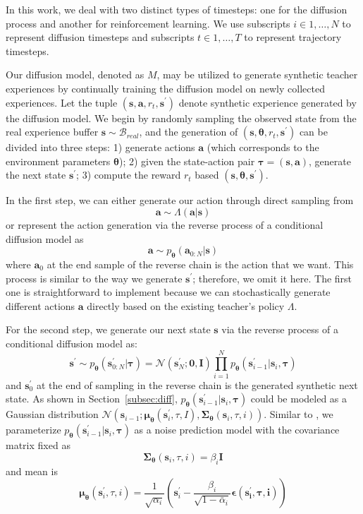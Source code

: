 \documentclass{article}
\newcommand\mI{\bm{I}}
\newcommand\vmu{\bm{\mu}}
\newcommand\va{\bm{a}}
\newcommand\vs{\bm{s}}
\newcommand\mSigma{\bm{\Sigma}}
\begin{document}
In this work, we deal with two distinct types of timesteps: one for the diffusion process and another for reinforcement learning. We use subscripts $i \in {1,\dots, N}$ to represent diffusion timesteps and subscripts $t \in {1,\dots,T}$ to represent trajectory timesteps.


Our diffusion model, denoted as $M$, may be utilized to generate synthetic teacher experiences by continually training the diffusion model on newly collected experiences. Let the tuple $(\vs,\va, r_t,\vs^\prime)$ denote synthetic experience generated by the diffusion model. We begin by randomly sampling the observed state from the real experience buffer $\vs\sim \bm{\mathcal{B}}_{real}$, and the generation of $(\vs,\bm{\theta}, r_t,\vs^\prime)$ can be divided into three steps: 1) generate actions $\va$ (which corresponds to the environment parameters $\bm{\theta}$); 2) given the state-action pair $\bm{\tau}=(\vs,\va)$, generate the next state $\vs^{\prime}$; 3) compute the reward $r_t$ based $(\vs,\bm{\theta},\vs^\prime)$.

In the first step, we can either generate our action through direct sampling from 
\begin{equation*}
    \va \sim \Lambda(\va|\vs)
\end{equation*}
or represent the action generation via the reverse process of a conditional diffusion model as 
\begin{equation*}
    \va \sim p_{\bm{\theta}}(\va_{0:N}|\vs)
\end{equation*}
where $\va_0$ at the end sample of the reverse chain is the action that we want. This process is similar to the way we generate $\vs^{\prime}$; therefore, we omit it here. The first one is straightforward to implement because we can stochastically generate different actions $\va$ directly based on the existing teacher's policy $\Lambda$.

For the second step, we generate our next state $\vs$ via the reverse process of a conditional diffusion model as:
\begin{equation*}
    \vs^{\prime} \sim p_{\bm{\theta}}(\vs_{0:N}^{\prime}|\bm{\tau})=\mathcal{N}(\vs_N^{\prime};\bm{0},\mI)\prod_{i=1}^N p_{\bm{\theta}}(\vs_{i-1}^{\prime}|\vs_i,\bm{\tau})
\end{equation*}
and $\vs_0^{\prime}$ at the end of sampling in the reverse chain is the generated synthetic next state. As shown in Section~\ref{subsec:diff}, $p_{\bm{\theta}}(\vs_{i-1}^{\prime}|\vs_i,\bm{\tau})$ could be modeled as a Gaussian distribution $\mathcal{N} ( \vs_{i-1} ; \vmu_{\bm{\theta}}(\vs_i^\prime,\tau,I),\mSigma_{\bm{\theta}}(\vs_i,\tau,i))$. Similar to \citet{ho2020denoising}, we parameterize $p_{\bm{\theta}}(\vs_{i-1}^{\prime}|\vs_i,\bm{\tau})$ as a noise prediction model with the covariance matrix fixed as 
$$\mSigma_{\bm{\theta}}(\vs_i,\tau,i)=\beta_i \mI$$
and mean is 
$$\vmu_{\bm{\theta}}(\vs_i^\prime,\tau,i) =\frac{1}{\sqrt{\alpha_i}}\left( \vs_i^\prime - \frac{\beta_i}{\sqrt{1-\bar{\alpha}_i} }\bm{\epsilon(\vs_i^\prime,\tau,i)} \right) $$
\end{document}
